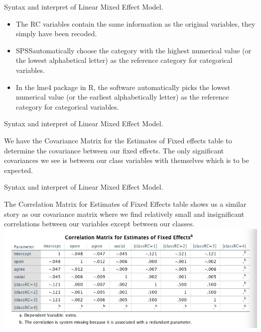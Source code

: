 \documentclass[ignorenonframetext,]{beamer}
\begin{document}
\begin{frame}{Syntax and interpret of Linear Mixed Effect Model.}

\begin{itemize}
\item
  The RC variables contain the same information as the original
  variables, they simply have been recoded.
\item
  SPSSautomatically choose the category with the highest numerical value
  (or the lowest alphabetical letter) as the reference category for
  categorical variables.
\item
  In the lme4 package in R, the software automatically picks the lowest
  numerical value (or the earliest alphabetically letter) as the
  reference category for categorical variables.
\end{itemize}

\end{frame}

\begin{frame}{Syntax and interpret of Linear Mixed Effect Model.}

We have the Covariance Matrix for the Estimates of Fixed effects table
to determine the covariance between our fixed effects. The only
significant covariances we see is between our class variables with
themselves which is to be expected.

\end{frame}

\begin{frame}{Syntax and interpret of Linear Mixed Effect Model.}

The Correlation Matrix for Estimates of Fixed Effects table shows us a
similar story as our covariance matrix where we find relatively small
and insignificant correlations between our variables except between our
classes.\\
\includegraphics{correlation.jpeg}\\

\end{frame}
\end{document}

